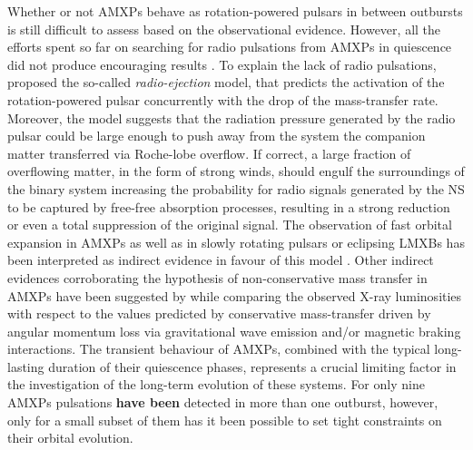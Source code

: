 \documentclass[fleqn,usenatbib]{mnras}
\begin{document}
Whether or not AMXPs behave as rotation-powered pulsars in between outbursts is still difficult to assess based on the observational evidence. However, all the efforts spent so far on searching for radio pulsations from AMXPs in quiescence did not produce encouraging results \citep[see e.g.,][]{Burgay:2003va,Patruno:2017ug,Sanna:2018td}. To explain the lack of radio pulsations, \citet{Burderi:2001wp} proposed the so-called \textit{radio-ejection} model, that predicts the activation of the rotation-powered pulsar concurrently with the drop of the mass-transfer rate. Moreover, the model suggests that the radiation pressure generated by the radio pulsar could be large enough to push away from the system the companion matter transferred via Roche-lobe overflow. If correct, a large fraction of overflowing matter, in the form of strong winds, should engulf the surroundings of the binary system increasing the probability for radio signals generated by the NS to be captured by free-free absorption processes, resulting in a strong reduction or even a total suppression of the original signal. The observation of fast orbital expansion in AMXPs \citep[see e.g.,][]{di-Salvo:2008uu,Burderi:2009td,Sanna:2016ty,Sanna:2017vj} as well as in slowly rotating pulsars or eclipsing LMXBs \citep[see e.g.,][]{Burderi:2010tk,Mazzola:2019wo,Iaria:2018tq} has been interpreted as indirect evidence in favour of this model \citep[however, see e.g.,][for alternative explanations]{Hartman:2008uj,Patruno:2012tw,Patruno:2017ug}. Other indirect evidences corroborating the hypothesis of non-conservative mass transfer in AMXPs have been suggested by \citet{Marino:2019vq} while comparing the observed X-ray luminosities with respect to the values predicted by conservative mass-transfer driven by angular momentum loss via gravitational wave emission and/or magnetic braking interactions. 
The transient behaviour of AMXPs, combined with the typical long-lasting duration of their quiescence phases, represents a crucial limiting factor in the investigation of the long-term evolution of these systems. For only nine AMXPs pulsations \textbf{have been} detected in more than one outburst, however, only for a small subset of them has it been possible to set tight constraints on their orbital evolution.
\end{document}
